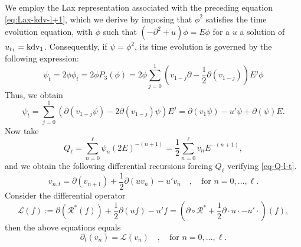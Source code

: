 \documentclass[a4paper,12pt]{article}
\newcommand{\cL}{\mathcal{L}}
\newcommand{\cR}{\mathcal{R}}
\def\kdv{\rm kdv}
\begin{document}
We employ the Lax representation associated with the preceding equation \eqref{eq:Lax-kdv-l+1}, which we derive by imposing that $\phi^2$ satisfies the time evolution equation, with $\phi$ such that $(-\partial^2 +u)\phi =E\phi$ for a $u$ a solution of $u_{t_1 } = \kdv_1$. Consequently, if $\psi=\phi^2$, its time evolution is governed by the following expression:
\begin{equation}
\psi_t =2\phi \phi_t = 2\phi P_{3}(\phi)= 2\phi\sum_{j=0}^1 \left(v_{1-j}\partial-\frac{1}{2}\partial(v_{1-j})\right)E^j \phi     
\end{equation}
Thus, we obtain
\begin{equation}\label{eq-Q-l-t}
   \psi_t = \sum_{j=0}^1 \left( 
   \partial(v_{1-j}\psi)-2\partial (v_{1-j})\psi 
   \right)
   E^j = 
   \partial(v_{1}\psi)-u'\psi 
    + 
   \partial(\psi)
   E.
\end{equation}
Now  take 
\begin{equation}\label{def-Q-ell} 
Q_\ell = \sum_{n=0}^\ell \psi_n (2E)^{-(n+1)}   = \frac12 \sum_{n=0}^\ell v_{n}  E^{-(n+1)} ,
\end{equation}
and  we obtain the following differential recursions forcing $Q_\ell$ verifying \eqref{eq-Q-l-t}.
\begin{equation}\label{recursion-densities-1}
    v_{n,t}= 
   \partial (v_{n+1} )+\frac12 \partial (uv_{n})-u' v_n \quad , \quad \textrm{for } n=0, \dots ,\ell .
\end{equation}
Consider the differential operator 
\begin{equation}\label{def-L}
 \cL(f):= \partial (\cR^* (f))+\frac12 \partial (uf) -u' f = (\partial \circ \cR^* + \frac12 \partial \cdot u\cdot  -u'\cdot )(f)   ,
\end{equation}
then the above equations equals
\[
\partial_t (v_n ) = \cL (v_n) \quad , \quad \textrm{for } n=0, \dots ,\ell . 
\]
\end{document}
